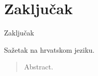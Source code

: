 \documentclass[times, utf8, zavrsni]{fer}
\begin{document}
\chapter{Zaključak}
Zaključak




\begin{sazetak}
Sažetak na hrvatskom jeziku.

\end{sazetak}

\begin{abstract}
Abstract.

\end{abstract}
\end{document}
